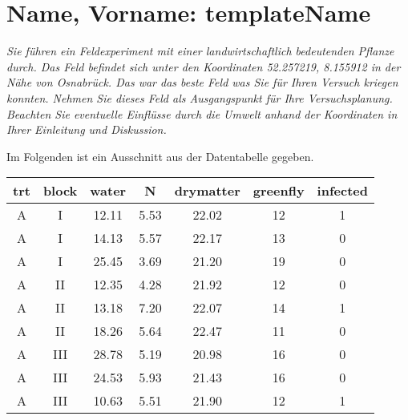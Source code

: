 \documentclass{scrartcl}\usepackage[]{graphicx}\usepackage[]{xcolor}
\newenvironment{knitrout}{}{} %
\begin{document}
\maketitle



\section*{Name, Vorname: templateName}









\textit{Sie führen ein Feldexperiment mit einer landwirtschaftlich bedeutenden Pflanze durch. Das Feld befindet sich unter den Koordinaten 52.257219, 8.155912 in der Nähe von Osnabrück. Das war das beste Feld was Sie für Ihren Versuch kriegen konnten. Nehmen Sie dieses Feld als Ausgangspunkt für Ihre Versuchsplanung. Beachten Sie eventuelle Einflüsse durch die Umwelt anhand der Koordinaten in Ihrer Einleitung und Diskussion.}

\vspace{1Ex}

Im Folgenden ist ein Ausschnitt aus der Datentabelle gegeben.

\vspace{1Ex}

\begin{center}
\begin{knitrout}
\color{fgcolor}
\begin{tabular}{ccccccc}
\toprule
trt & block & water & N & drymatter & greenfly & infected\\
\midrule
A & I & 12.11 & 5.53 & 22.02 & 12 & 1\\
A & I & 14.13 & 5.57 & 22.17 & 13 & 0\\
A & I & 25.45 & 3.69 & 21.20 & 19 & 0\\
A & II & 12.35 & 4.28 & 21.92 & 12 & 0\\
A & II & 13.18 & 7.20 & 22.07 & 14 & 1\\
\addlinespace
A & II & 18.26 & 5.64 & 22.47 & 11 & 0\\
A & III & 28.78 & 5.19 & 20.98 & 16 & 0\\
A & III & 24.53 & 5.93 & 21.43 & 16 & 0\\
A & III & 10.63 & 5.51 & 21.90 & 12 & 1\\
\bottomrule
\end{tabular}

\end{knitrout}
\end{center}
\end{document}

